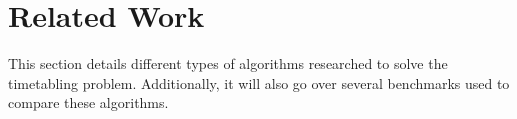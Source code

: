 
\section{Related Work}\label{sec:related-work}

This section details different types of algorithms researched to solve the timetabling problem. Additionally, it will also go over several benchmarks used to compare these algorithms.


